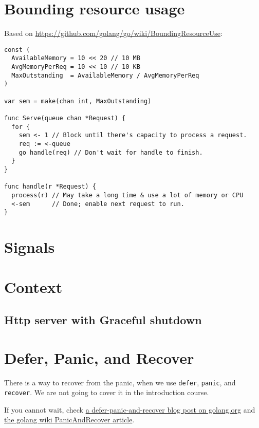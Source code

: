 \documentclass[11pt, letterpaper]{article}
\begin{document}
\section{Bounding resource usage}

Based on \href{go/wiki/BoundingResourceUse}{https://github.com/golang/go/wiki/BoundingResourceUse}:

\begin{verbatim}
const (
  AvailableMemory = 10 << 20 // 10 MB
  AvgMemoryPerReq = 10 << 10 // 10 KB
  MaxOutstanding  = AvailableMemory / AvgMemoryPerReq
)

var sem = make(chan int, MaxOutstanding)

func Serve(queue chan *Request) {
  for {
    sem <- 1 // Block until there's capacity to process a request.
    req := <-queue
    go handle(req) // Don't wait for handle to finish.
  }
}

func handle(r *Request) {
  process(r) // May take a long time & use a lot of memory or CPU
  <-sem      // Done; enable next request to run.
}
\end{verbatim}


\section{Signals}



\section{Context}


\subsection{Http server with Graceful shutdown}



\section{Defer, Panic, and Recover}

There is a way to recover from the panic, when we use \verb|defer|, \verb|panic|, and \verb|recover|. We are not going to cover it in the introduction course.

If you cannot wait, check \href{https://blog.golang.org/defer-panic-and-recover}{a defer-panic-and-recover blog post on golang.org} and \href{https://github.com/golang/go/wiki/PanicAndRecover}{the golang wiki PanicAndRecover article}.
\end{document}
